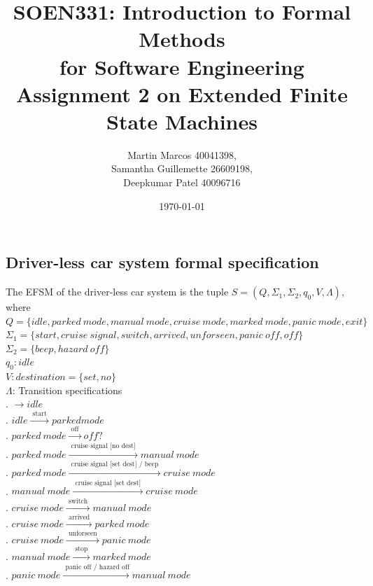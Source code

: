 \documentclass[12pt]{article}
\title{SOEN331: Introduction to Formal Methods\\for Software Engineering\\
Assignment 2 on Extended Finite State Machines}
\author{Martin Marcos 40041398,\\ Samantha Guillemette 26609198,\\ Deepkumar Patel 40096716  }
\date{\today}
\begin{document}
\begin{spacing}{1.5}

\maketitle

\section{Driver-less car system formal specification}

\noindent The EFSM of the driver-less car system is the tuple $S = (Q, \Sigma_1, \Sigma_2, q_0, V, \Lambda)$, where\\

\noindent $Q = \{idle, parked~mode, manual~mode, cruise~mode, marked~mode, panic~mode, exit\}$\\
\noindent $\Sigma_1 = \{start, cruise~signal, switch, arrived, unforseen,panic~off, off\}$\\
\noindent $\Sigma_2 = \{beep, hazard~off\}$\\
\noindent $q_0: idle$\\
\noindent $V: destination = \{set, no\}$\\
\noindent $\Lambda$: Transition specifications\\
. $\rightarrow idle$\\
. $idle \xrightarrow {\text { start }} parked mode$\\
. $parked~mode  \xrightarrow {\text { off }} off?$\\
. $parked~mode  \xrightarrow {\text { cruise signal [no dest] }} manual~mode$\\
. $parked~mode  \xrightarrow {\text { cruise signal [set dest] / beep }} cruise~mode$\\
. $manual~mode  \xrightarrow {\text { cruise signal [set dest] }} cruise~mode$\\
. $cruise~mode  \xrightarrow {\text { switch }} manual~mode$\\
. $cruise~mode  \xrightarrow {\text { arrived }} parked~mode$\\
. $cruise~mode  \xrightarrow {\text { unforseen }} panic~mode$\\
. $manual~mode  \xrightarrow {\text { stop }} marked~mode$\\
. $panic~mode  \xrightarrow {\text { panic off / hazard off}} manual~mode$\\


\end{spacing}
\end{document}
